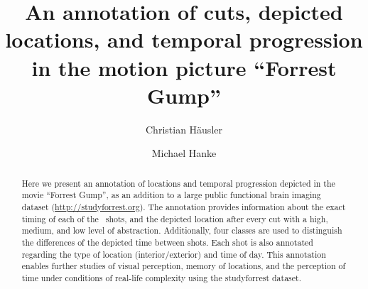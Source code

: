 \documentclass[10pt,a4paper]{article}
\begin{document}


\title{An annotation of cuts, depicted locations, and temporal progression in
the motion picture ``Forrest Gump''}

\author[1]{Christian Häusler}
\author[1,2]{Michael Hanke}

\maketitle
\thispagestyle{fancy}

\begin{multicols}{1}
\begin{abstract}

Here we present an annotation of locations and temporal progression depicted in
the movie ``Forrest Gump'', as an addition to a large public functional brain
imaging dataset (\url{http://studyforrest.org}). The annotation provides
information about the exact timing of each of the \NShots\ shots, and the
depicted location after every cut with a high, medium, and low level of
abstraction. Additionally, four classes are used to distinguish the differences
of the depicted time between shots. Each shot is also annotated regarding the
type of location (interior/exterior) and time of day. This annotation enables
further studies of visual perception, memory of locations, and the perception of
time under conditions of real-life complexity using the studyforrest dataset.

\end{abstract}
\end{multicols}
\end{document}
